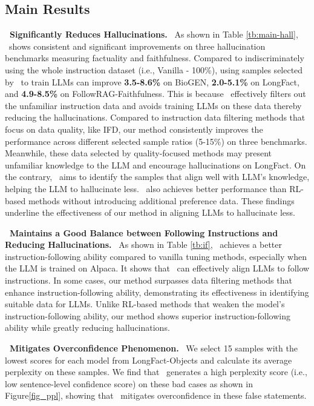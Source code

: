 \subsection{Main Results}
\textbf{\OURS~Significantly Reduces Hallucinations.}
\
As shown in Table \ref{tb:main-hall}, \OURS~shows consistent and significant improvements on three hallucination benchmarks measuring factuality and faithfulness.
Compared to indiscriminately using the whole instruction dataset (i.e., Vanilla - 100\%), using samples selected by \OURS~to train LLMs can improve \textbf{3.5-8.6\%} on BioGEN, \textbf{2.0-5.1\%} on LongFact, and \textbf{4.9-8.5\%} on FollowRAG-Faithfulness.
This is because \OURS~effectively filters out the unfamiliar instruction data and avoids training LLMs on these data thereby reducing the hallucinations.
Compared to instruction data filtering methods that focus on data quality, like IFD, our method consistently improves the performance across different selected sample ratios (5-15\%) on three benchmarks.
Meanwhile, these data selected by quality-focused methods may present unfamiliar knowledge to the LLM and encourage hallucinations on LongFact.
On the contrary, \OURS~aims to identify the samples that align well with LLM’s knowledge, helping the LLM to hallucinate less.
\OURS~also achieves better performance than RL-based methods without introducing additional preference data.
These findings underline the effectiveness of our method in aligning LLMs to hallucinate less.


\noindent
\textbf{\OURS~Maintains a Good Balance between Following Instructions and Reducing Hallucinations.}
\
As shown in Table \ref{tb:if}, \OURS~achieves a better instruction-following ability compared to vanilla tuning methods, especially when the LLM is trained on Alpaca.
It shows that \OURS~can effectively align LLMs to follow instructions.
In some cases, our method surpasses data filtering methods that enhance instruction-following ability, demonstrating its effectiveness in identifying suitable data for LLMs.
Unlike RL-based methods that weaken the model's instruction-following ability, our method shows superior instruction-following ability while greatly reducing hallucinations.

\noindent
\textbf{\OURS~Mitigates Overconfidence Phenomenon.}
\
We select 15 samples with the lowest scores for each model from LongFact-Objects and calculate its average perplexity on these samples.
We find that \OURS~generates a high perplexity score (i.e., low sentence-level confidence score) on these bad cases as shown in Figure\ref{fig_ppl}, showing that \OURS~mitigates overconfidence in these false statements.



